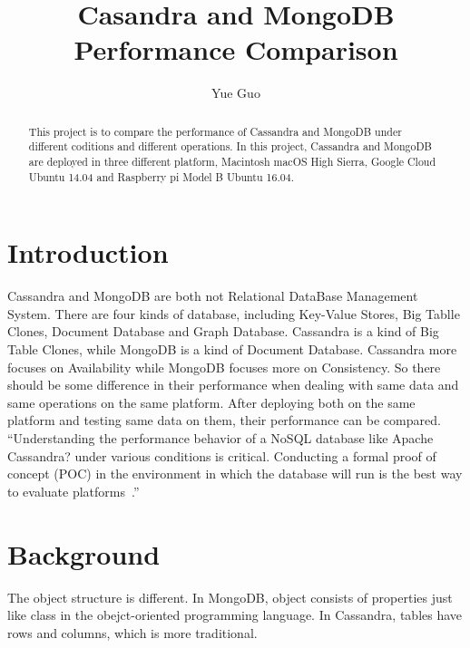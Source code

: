 
\title{Casandra and MongoDB Performance Comparison}

\author{Yue Guo}

\begin{abstract}
This project is to compare the performance of Cassandra and MongoDB 
under different coditions and different operations. In this project, Cassandra
 and MongoDB are deployed in three different platform, Macintosh macOS 
 High Sierra, Google Cloud Ubuntu 14.04 and Raspberry pi Model B Ubuntu 
 16.04.
\end{abstract}



\maketitle


\section{Introduction}
Cassandra and MongoDB are both not Relational DataBase Management System. 
There are four kinds of database, including Key-Value Stores, Big Tablle 
Clones, Document Database and Graph Database. Cassandra is a kind of Big 
Table Clones, while MongoDB is a kind of Document Database. Cassandra more 
focuses on Availability while MongoDB focuses more on Consistency. So there
 should be some difference in their performance when dealing with same data 
 and same operations on the same platform. After deploying both on the same 
 platform and testing same data on them, their performance can be compared. 
 ``Understanding the performance behavior of a NoSQL database like Apache 
 Cassandra? under various conditions is critical. Conducting a formal proof 
 of concept (POC) in the environment in which the database will run is the 
 best way to evaluate platforms~\cite{hid-sp18-508-benchmarking}.''

\section{Background}
The object structure is different. In MongoDB, object consists of properties
 just like class in the obejct-oriented programming language. In Cassandra,
  tables have rows and columns, which is more traditional.

